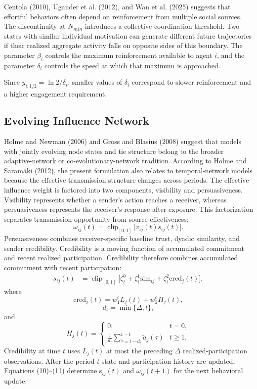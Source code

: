 \documentclass[11pt]{article}
\newcommand{\clip}{\operatorname{clip}_{[0,1]}}
\begin{document}
Centola (2010), Ugander et al. (2012), and Wan et al. (2025) suggests that effortful behaviors often depend on reinforcement from multiple social sources. The discontinuity at $N_{min}$ introduces a collective coordination threshold. Two states with similar individual motivation can generate different future trajectories if their realized aggregate activity falls on opposite sides of this boundary. The parameter $\beta_i$ controls the maximum reinforcement available to agent $i$, and the parameter $\delta_i$ controls the speed at which that maximum is approached.

Since $y_{i,1/2}=\ln2/\delta_i$, smaller values of $\delta_i$ correspond to slower reinforcement and a higher engagement requirement.

\subsection{Evolving Influence Network}
Holme and Newman (2006) and Gross and Blasius (2008) suggest that models with jointly evolving node states and tie structure belong to the broader adaptive-network or co-evolutionary-network tradition. According to Holme and Saramäki (2012), the present formulation also relates to temporal-network models because the effective transmission structure changes across periods. The effective influence weight is factored into two components, visibility and persuasiveness. Visibility represents whether a sender’s action reaches a receiver, whereas persuasiveness represents the receiver’s response after exposure. This factorization separates transmission opportunity from source effectiveness:
\begin{equation}\tag{9}\label{eq:omega}
\omega_{ij}(t)=\clip\!\big[v_{ij}(t)s_{ij}(t)\big].
\end{equation}
Persuasiveness combines receiver-specific baseline trust, dyadic similarity, and sender credibility. Credibility is a moving function of accumulated commitment and recent realized participation. Credibility therefore combines accumulated commitment with recent participation:
\begin{align}
s_{ij}(t)&=\clip\big[ \zeta_i^0+\zeta_i^1\mathrm{sim}_{ij}+\zeta_i^2\mathrm{cred}_j(t)\big],\tag{10}\label{eq:persuade}
\end{align}
where
\[
\mathrm{cred}_j(t)=w_1^cL_j(t)+w_2^cH_j(t),\tag{11}\label{eq:cred}
\]
\[
d_t=\min\{\Delta,t\},
\]
and
\[
H_j(t)=
\begin{cases}
0, & t=0, \\
\frac{1}{d_t}\sum_{\tau=t-d_t}^{t-1}\tilde a_j(\tau) & t\ge1.
\end{cases}
\]
Credibility at time $t$ uses $L_j(t)$ at most the preceding $\Delta$ realized-participation observations. After the period-$t$ state and participation history are updated, Equations (10)--(11) determine s$_{ij}(t)$ and $\omega_{ij}(t+1)$ for the next behavioral update.
\end{document}
